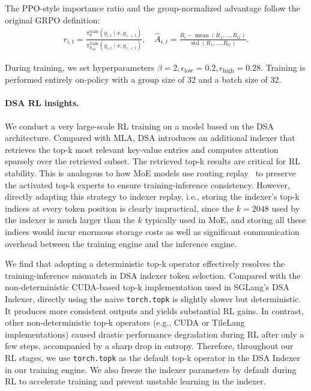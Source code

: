 The PPO-style importance ratio and the group-normalized advantage follow the original GRPO definition:
\begin{align*}
r_{i,t}
=
\frac{
\pi_\theta^{\text{train}}(y_{i,t}\mid x,y_{i,<t})
}{
\pi_{\theta_{\text{old}}}^{\text{train}}(y_{i,t}\mid x,y_{i,<t})
},
\quad
\hat{A}_{i,t}
=
\frac{
R_i - \operatorname{mean}(R_1,\dots,R_G)
}{
\operatorname{std}(R_1,\dots,R_G)
}.
\end{align*}

During training, we set hyperparameters $\beta=2, \epsilon_{\text{low}}=0.2, \epsilon_{\text{high}}=0.28$. Training is performed entirely on-policy with a group size of 32 and a batch size of 32.

\paragraph{DSA RL insights.}
We conduct a very large-scale RL training on a model based on the DSA architecture. Compared with MLA, DSA introduces an additional indexer that retrieves the top-k most relevant key-value entries and computes attention sparsely over the retrieved subset.
The retrieved top-k results are critical for RL stability. This is analogous to how MoE models use routing replay~\cite{zheng2025group} to preserve the activated top-k experts to ensure training-inference consistency.
However, directly adapting this strategy to indexer replay, i.e., storing the indexer’s top-k indices at every token position is clearly impractical, since the $k = 2048$ used by the indexer is much larger than the $k$ typically used in MoE, and storing all these indices would incur enormous storage costs as well as significant communication overhead between the training engine and the inference engine.

We find that adopting a deterministic top-k operator effectively resolves the training-inference mismatch in DSA indexer token selection. Compared with the non-deterministic CUDA-based top‑k implementation used in SGLang’s DSA Indexer, directly using the naive \texttt{torch.topk} is slightly slower but deterministic. It produces more consistent outputs and yields substantial RL gains. In contrast, other non-deterministic top‑k operators (e.g., CUDA or TileLang implementations) caused drastic performance degradation during RL after only a few steps, accompanied by a sharp drop in entropy. Therefore, throughout our RL stages, we use \texttt{torch.topk} as the default top-k operator in the DSA Indexer in our training engine. We also freeze the indexer parameters by default during RL to accelerate training and prevent unstable learning in the indexer.

